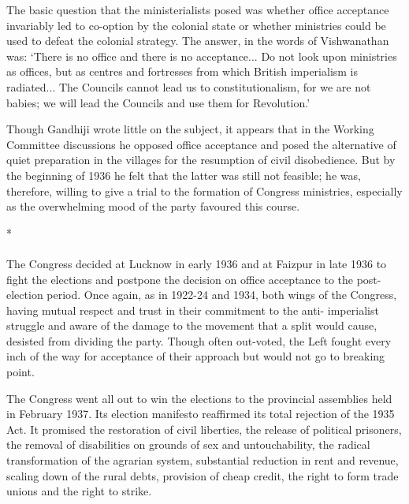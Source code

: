The basic question that the ministerialists posed was whether office acceptance invariably led to co-option by the colonial state or whether ministries could be used to defeat the colonial strategy. The answer, in the words of Vishwanathan was: `There is no office and there is no acceptance... Do not look upon ministries as offices, but as centres and fortresses from which British imperialism is radiated... The Councils cannot lead us to constitutionalism, for we are not babies; we will lead the Councils and use them for Revolution.' 

Though Gandhiji wrote little on the subject, it appears that in the Working Committee discussions he opposed office acceptance and posed the alternative of quiet preparation in the villages for the resumption of civil disobedience. But by the beginning of 1936 he felt that the latter was still not feasible; he was, therefore, willing to give a trial to the formation of Congress ministries, especially as the overwhelming mood of the party favoured this course.

\begin{center}*\end{center}

\paragraph*{}


The Congress decided at Lucknow in early 1936 and at Faizpur in late 1936 to fight the elections and postpone the decision on office acceptance to the post-election period. Once again, as in 1922-24 and 1934, both wings of the Congress, having mutual respect and trust in their commitment to the anti- imperialist struggle and aware of the damage to the movement that a split would cause, desisted from dividing the party. Though often out-voted, the Left fought every inch of the way for acceptance of their approach but would not go to breaking point. 

The Congress went all out to win the elections to the provincial assemblies held in February 1937. Its election manifesto reaffirmed its total rejection of the 1935 Act. It promised the restoration of civil liberties, the release of political prisoners, the removal of disabilities on grounds of sex and untouchability, the radical transformation of the agrarian system, substantial reduction in rent and revenue, scaling down of the rural debts, provision of cheap credit, the right to form trade unions and the right to strike. 

